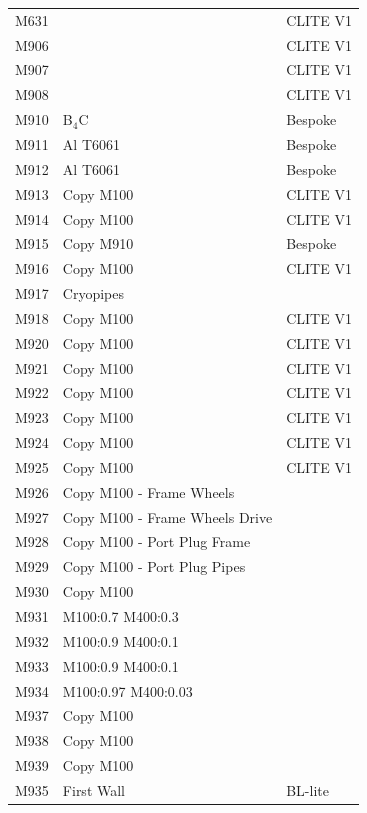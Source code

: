 \documentclass[12pt]{article}
\begin{document}
\begin{centering}
\begin{longtable}[ht!]{ p{} | p{} | p{} }
  M631  & &  CLITE V1 \\
  M906  & &  CLITE V1 \\
  M907  & &  CLITE V1 \\
  M908  & &  CLITE V1 \\
  M910 & B$_4$C & Bespoke  \\
  M911 & Al T6061 & Bespoke  \\
  M912 & Al T6061 & Bespoke  \\
  M913 & Copy M100 & CLITE V1\\
  M914 & Copy M100 & CLITE V1\\
  M915 & Copy M910 & Bespoke \\
  M916 & Copy M100 & CLITE V1\\
  M917 & Cryopipes & \cite{neutr anal materials}\\
  M918 & Copy M100 & CLITE V1 \\
  M920 & Copy M100 & CLITE V1 \\
  M921 & Copy M100 & CLITE V1 \\
  M922 & Copy M100 & CLITE V1 \\
  M923 & Copy M100 & CLITE V1 \\
  M924 & Copy M100 & CLITE V1 \\
  M925 & Copy M100 & CLITE V1 \\
  M926 & Copy M100 - Frame Wheels & \cite{neutr_anal_materials}\\
  M927 & Copy M100 - Frame Wheels Drive & \cite{neutr_anal_materials}\\
  M928 & Copy M100 - Port Plug Frame & \cite{neutr_anal_materials}\\
  M929 & Copy M100 - Port Plug Pipes & \cite{neutr_anal_materials}\\
  M930 & Copy M100 & \cite{neutr_anal_materials}\\
  M931 & M100:0.7 M400:0.3 & \cite{neutr_anal_materials}\\
  M932 & M100:0.9 M400:0.1 & \cite{neutr_anal_materials}\\
  M933 & M100:0.9 M400:0.1 & \cite{neutr_anal_materials}\\
  M934 & M100:0.97 M400:0.03 & \cite{neutr_anal_materials}\\
  M937 & Copy M100 & \cite{neutr_anal_materials}\\
  M938 & Copy M100 & \cite{neutr_anal_materials}\\
  M939 & Copy M100 & \cite{neutr_anal_materials}\\
  M935 & First Wall & BL-lite \\

\end{longtable}
\end{centering}
\end{document}
